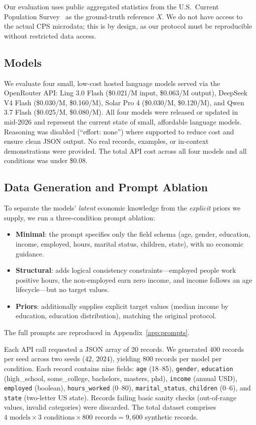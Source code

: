\documentclass[11pt]{article}
\begin{document}
Our evaluation uses public aggregated statistics from the U.S.\ Current Population Survey~\cite{bls2024earnings,bls2024unemployment,census2024attainment} as the ground-truth reference $X$. We do not have access to the actual CPS microdata; this is by design, as our protocol must be reproducible without restricted data access.

\subsection{Models}

We evaluate four small, low-cost hosted language models served via the OpenRouter API: Ling 3.0 Flash (\$0.021/M input, \$0.063/M output), DeepSeek V4 Flash (\$0.030/M, \$0.160/M), Solar Pro 4 (\$0.030/M, \$0.120/M), and Qwen 3.7 Flash (\$0.025/M, \$0.080/M).
All four models were released or updated in mid-2026 and represent the current state of small, affordable language models.
Reasoning was disabled (``effort: none'') where supported to reduce cost and ensure clean JSON output.
No real records, examples, or in-context demonstrations were provided.
The total API cost across all four models and all conditions was under \$0.08.

\subsection{Data Generation and Prompt Ablation}

To separate the models' \emph{latent} economic knowledge from the \emph{explicit} priors we supply, we run a three-condition prompt ablation:
\begin{itemize}[leftmargin=*, itemsep=1pt]
  \item \textbf{Minimal}: the prompt specifies only the field schema (age, gender, education, income, employed, hours, marital status, children, state), with no economic guidance.
  \item \textbf{Structural}: adds logical consistency constraints---employed people work positive hours, the non-employed earn zero income, and income follows an age lifecycle---but no target values.
  \item \textbf{Priors}: additionally supplies explicit target values (median income by education, education distribution), matching the original protocol.
\end{itemize}
The full prompts are reproduced in Appendix~\ref{app:prompts}.

Each API call requested a JSON array of 20 records.
We generated 400 records per seed across two seeds ($42$, $2024$), yielding 800 records per model per condition.
Each record contains nine fields: \texttt{age} (18--85), \texttt{gender}, \texttt{education} (high\_school, some\_college, bachelors, masters, phd), \texttt{income} (annual USD), \texttt{employed} (boolean), \texttt{hours\_worked} (0--80), \texttt{marital\_status}, \texttt{children} (0--6), and \texttt{state} (two-letter US state).
Records failing basic sanity checks (out-of-range values, invalid categories) were discarded.
The total dataset comprises $4 \text{ models} \times 3 \text{ conditions} \times 800 \text{ records} = 9{,}600$ synthetic records.
\end{document}
